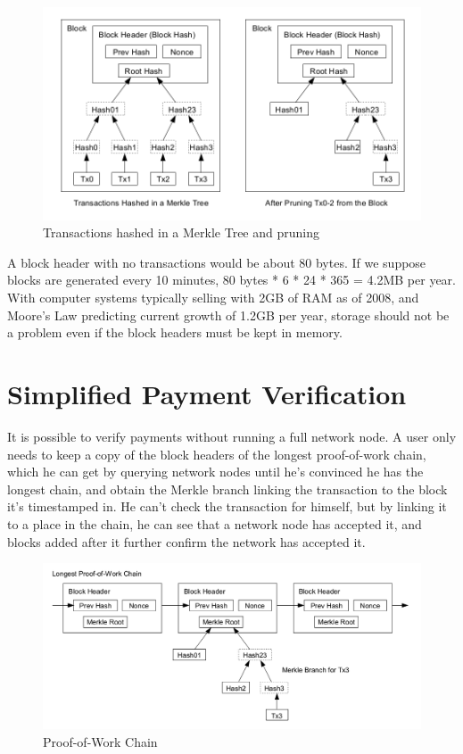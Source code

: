 \begin{figure}[ht!]
\centering
\includegraphics[trim = 0mm 0mm 0mm 0mm, width=120mm]{images/merkle_tree_and_pruning}
\caption{Transactions hashed in a Merkle Tree and pruning}
\end{figure}

A block header with no transactions would be about 80 bytes. If we suppose blocks are generated every 10 minutes, 80 bytes * 6 * 24 * 365 = 4.2MB per year. With computer systems typically selling with 2GB of RAM as of 2008, and Moore's Law predicting current growth of 1.2GB per year, storage should not be a problem even if the block headers must be kept in memory.

\section{Simplified Payment Verification}

It is possible to verify payments without running a full network node. A user only needs to keep a copy of the block headers of the longest proof-of-work chain, which he can get by querying network nodes until he's convinced he has the longest chain, and obtain the Merkle branch linking the transaction to the block it's timestamped in. He can't check the transaction for himself, but by linking it to a place in the chain, he can see that a network node has accepted it, and blocks added after it further confirm the network has accepted it.

\begin{figure}[ht!]
\centering
\includegraphics[trim = 0mm 0mm 0mm 0mm, width=120mm]{images/proof_of_work}
\caption{Proof-of-Work Chain}
\end{figure}

